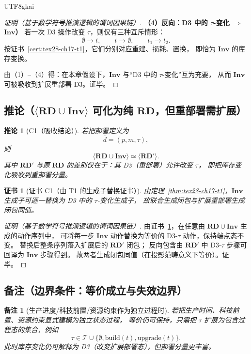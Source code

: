 \documentclass[12pt]{article}
\newtheorem{corollary}{推论}[section]
\newtheorem{remark}{备注}[section]
\newtheorem{Certificate}{证书}[section]
\begin{document}
\begin{CJK*}{UTF8}{gkai}
\begin{proof}[证明（基于数学符号推演逻辑的谓词因果链）]
\textbf{（4）反向：D3 中的 $\tau$-变化 $\Rightarrow$ $\mathbf{Inv}$）}
若一次 D3 操作改变 $\tau$，则仅有三种互斥情形：
\[
  \emptyset\to t,\qquad t\to\emptyset,\qquad t_1\to t_2.
\]
按证书~\ref{cert:tex28-ch17-t1}，它们分别对应重建、损耗、置换，
即恰为 $\mathbf{Inv}$ 的库存变换。

由（1）--（4）得：在本章假设下，$\mathbf{Inv}$ 与“D3 中的 $\tau$-变化”互为充要，
从而 $\mathbf{Inv}$ 可被吸收到扩展重部署 D3。证毕。
\end{proof}

\subsection{推论（$\langle\mathbf{RD}\cup\mathbf{Inv}\rangle$ 可化为纯 $\mathbf{RD}$，但重部署需扩展）}
\label{subsec:tex28-ch17-cor}

\begin{corollary}[C1（吸收结论）]
\label{cor:tex28-ch17-c1}
若把部署定义为
\[
  \bar d=(p,m,\tau),
\]
则
\[
  \boxed{
    \langle\mathbf{RD}\cup\mathbf{Inv}\rangle
    \simeq
    \langle\mathbf{RD}'\rangle
  }.
\]
其中 $\mathbf{RD}'$ 与原 $\mathbf{RD}$ 的差别仅在于：其 D3（重部署）允许改变 $\tau$，
即把库存变化吸收到重部署分量。
\end{corollary}

\begin{Certificate}[证书 C1（由 T1 的生成子替换证书）]
\label{cert:tex28-ch17-c1}
由定理~\ref{thm:tex28-ch17-t1}，$\mathbf{Inv}$ 生成子可逐一替换为 D3 中的 $\tau$-变化生成子，
故联合生成闭包与扩展重部署生成闭包同值。
\end{Certificate}

\begin{proof}[证明（基于数学符号推演逻辑的谓词因果链）]
由证书~\ref{cert:tex28-ch17-c1}，在任意由 $\mathbf{RD}\cup\mathbf{Inv}$ 生成的动作序列中，
可将每一步 $\mathbf{Inv}$ 动作替换为等价的 D3-$\tau$ 动作，保持端点态不变。
替换后整条序列落入扩展后的 $\mathbf{RD}'$ 闭包；
反向包含由 $\mathbf{RD}'$ 中 D3-$\tau$ 步骤可回译为 $\mathbf{Inv}$ 步骤得到。
故两者生成闭包同值（在投影范畴意义下等价）。证毕。
\end{proof}

\subsection{备注（边界条件：等价成立与失效边界）}
\label{subsec:tex28-ch17-remarks}

\begin{remark}[生产进度/科技前置/资源约束作为独立过程时]
若把生产时间、科技前置、资源约束显式建模为独立状态过程，
等价仍可保持，只需把 $\tau$ 扩展为包含过程态的集合，例如
\[
  \tau\in\mathcal T\cup\{\emptyset,\mathrm{build}(t),\mathrm{upgrade}(t)\}.
\]
此时库存变化仍可解释为 D3（改变扩展部署态），但部署分量更丰富。
\end{remark}


\end{CJK*}
\end{document}
